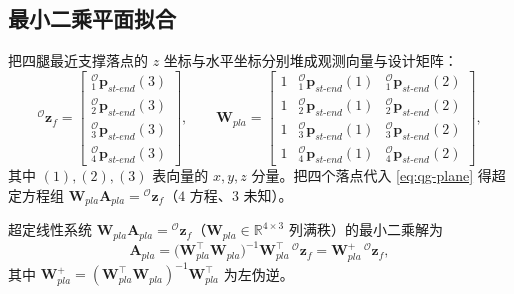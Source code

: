 \subsection{最小二乘平面拟合}
\label{subsec:qg-ls}

把四腿最近支撑落点的 $z$ 坐标与水平坐标分别堆成观测向量与设计矩阵\cite{yu2021quadruped}：
\begin{equation}
  {}^{\mathcal{O}}\boldsymbol{z}_f=
  \begin{bmatrix}
  {}_1^{\mathcal{O}}\boldsymbol{p}_{st\text{-}end}(3) \\ {}_2^{\mathcal{O}}\boldsymbol{p}_{st\text{-}end}(3) \\ {}_3^{\mathcal{O}}\boldsymbol{p}_{st\text{-}end}(3) \\ {}_4^{\mathcal{O}}\boldsymbol{p}_{st\text{-}end}(3)
  \end{bmatrix},
  \qquad
  \mathbf{W}_{pla}=
  \begin{bmatrix}
  1 & {}_1^{\mathcal{O}}\boldsymbol{p}_{st\text{-}end}(1) & {}_1^{\mathcal{O}}\boldsymbol{p}_{st\text{-}end}(2) \\
  1 & {}_2^{\mathcal{O}}\boldsymbol{p}_{st\text{-}end}(1) & {}_2^{\mathcal{O}}\boldsymbol{p}_{st\text{-}end}(2) \\
  1 & {}_3^{\mathcal{O}}\boldsymbol{p}_{st\text{-}end}(1) & {}_3^{\mathcal{O}}\boldsymbol{p}_{st\text{-}end}(2) \\
  1 & {}_4^{\mathcal{O}}\boldsymbol{p}_{st\text{-}end}(1) & {}_4^{\mathcal{O}}\boldsymbol{p}_{st\text{-}end}(2)
  \end{bmatrix},
  \label{eq:qg-zW}
\end{equation}
其中 $(1),(2),(3)$ 表向量的 $x,y,z$ 分量。把四个落点代入 \cref{eq:qg-plane} 得超定方程组 $\mathbf{W}_{pla}\mathbf{A}_{pla}={}^{\mathcal{O}}\boldsymbol{z}_f$（$4$ 方程、$3$ 未知）。

\begin{theorem}[平面参数的最小二乘解]\label{thm:qg-ls}
超定线性系统 $\mathbf{W}_{pla}\mathbf{A}_{pla}={}^{\mathcal{O}}\boldsymbol{z}_f$（$\mathbf{W}_{pla}\in\mathbb{R}^{4\times3}$ 列满秩）的最小二乘解为
\begin{equation}
  \mathbf{A}_{pla}=\big(\mathbf{W}_{pla}^\top\mathbf{W}_{pla}\big)^{-1}\mathbf{W}_{pla}^\top\,{}^{\mathcal{O}}\boldsymbol{z}_f=\mathbf{W}_{pla}^{+}\,{}^{\mathcal{O}}\boldsymbol{z}_f,
  \label{eq:qg-ls}
\end{equation}
其中 $\mathbf{W}_{pla}^{+}=(\mathbf{W}_{pla}^\top\mathbf{W}_{pla})^{-1}\mathbf{W}_{pla}^\top$ 为左伪逆\cite{yu2021quadruped}。
\end{theorem}

